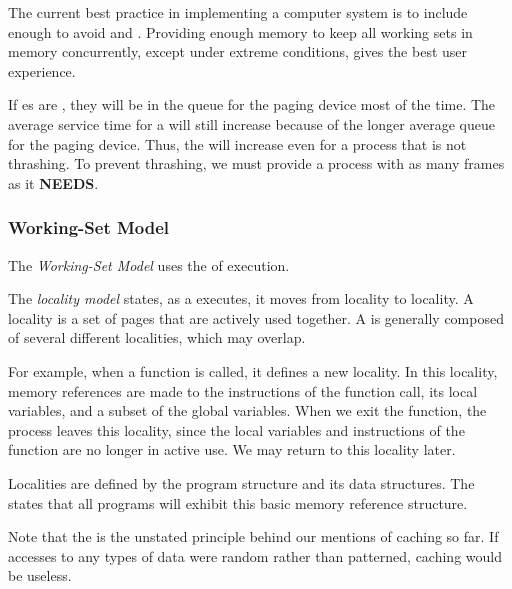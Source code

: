 \begin{remark*}
  The current best practice in implementing a computer system is to include enough  to avoid  and .
  Providing enough memory to keep all working sets in memory concurrently, except under extreme conditions, gives the best user experience.
\end{remark*}

If es are , they will be in the queue for the paging device most of the time.
The average service time for a  will still increase because of the longer average queue for the paging device.
Thus, the  will increase even for a process that is not thrashing.
To prevent thrashing, we must provide a process with as many frames as it \textbf{NEEDS}.

\subsubsection{Working-Set Model}\label{subsubsec:Working_Set_Model}
The \emph{Working-Set Model} uses the  of  execution.

\begin{definition}\label{def:Locality_Model}
  The \emph{locality model} states, as a  executes, it moves from locality to locality.
  A locality is a set of pages that are actively used together.
  A  is generally composed of several different localities, which may overlap.

  For example, when a function is called, it defines a new locality.
  In this locality, memory references are made to the instructions of the function call, its local variables, and a subset of the global variables.
  When we exit the function, the process leaves this locality, since the local variables and instructions of the function are no longer in active use.
  We may return to this locality later.
\end{definition}

Localities are defined by the program structure and its data structures.
The  states that all programs will exhibit this basic memory reference structure.

\begin{blackbox}
  \begin{remark*}
    Note that the  is the unstated principle behind our mentions of caching so far.
    If accesses to any types of data were random rather than patterned, caching would be useless.
  \end{remark*}
\end{blackbox}


